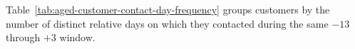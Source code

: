 Table~\ref{tab:aged-customer-contact-day-frequency} groups customers by the
number of distinct relative days on which they contacted during the same
$-13$ through $+3$ window.
